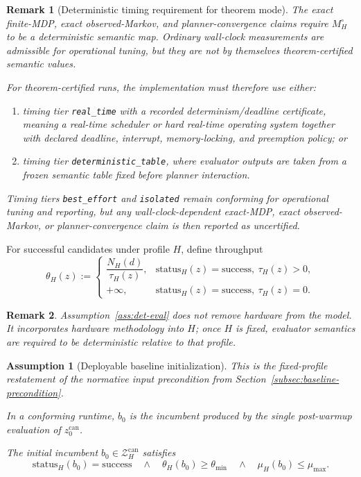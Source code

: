 \documentclass[11pt]{article}
\newtheorem{remark}{Remark}
\newtheorem{assumption}{Assumption}
\begin{document}
\begin{remark}[Deterministic timing requirement for theorem mode]
The exact finite-MDP, exact observed-Markov, and planner-convergence claims
require $M_H^\circ$ to be a deterministic semantic map. Ordinary wall-clock
measurements are admissible for operational tuning, but they are not by
themselves theorem-certified semantic values.

For theorem-certified runs, the implementation must therefore use either:
\begin{enumerate}
    \item timing tier \texttt{real\_time} with a recorded
    determinism/deadline certificate, meaning a real-time scheduler or hard
    real-time operating system together with declared deadline, interrupt,
    memory-locking, and preemption policy; or
    \item timing tier \texttt{deterministic\_table}, where evaluator outputs
    are taken from a frozen semantic table fixed before planner interaction.
\end{enumerate}
Timing tiers \texttt{best\_effort} and \texttt{isolated} remain conforming for
operational tuning and reporting, but any wall-clock-dependent exact-MDP,
exact observed-Markov, or planner-convergence claim is then reported as
uncertified.
\end{remark}

For successful candidates under profile $H$, define throughput
\[
\theta_H(z):=
\begin{cases}
\dfrac{N_H(d)}{\tau_H(z)}, & \mathrm{status}_H(z)=\mathrm{success},\ \tau_H(z)>0,\\[4pt]
+\infty, & \mathrm{status}_H(z)=\mathrm{success},\ \tau_H(z)=0.
\end{cases}
\]

\begin{remark}
Assumption~\ref{ass:det-eval} does not remove hardware from the model. It
incorporates hardware methodology into $H$; once $H$ is fixed, evaluator
semantics are required to be deterministic relative to that profile.
\end{remark}

\begin{assumption}[Deployable baseline initialization]\label{ass:baseline-succ}
This is the fixed-profile restatement of the normative input precondition from
Section~\ref{subsec:baseline-precondition}.

In a conforming runtime, $b_0$ is the incumbent produced by the single
post-warmup evaluation of $z_0^{\mathrm{can}}$.

The initial incumbent $b_0\in\mathcal{Z}_H^{\mathrm{can}}$ satisfies
\[
\mathrm{status}_H(b_0)=\mathrm{success}
\quad\land\quad
\theta_H(b_0)\ge\theta_{\min}
\quad\land\quad
\mu_H(b_0)\le\mu_{\max}.
\]
\end{assumption}
\end{document}

